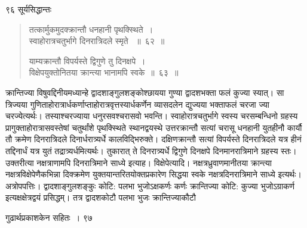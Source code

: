 \documentclass[11pt, openany]{book}
\begin{document}
\noindent ९६ \hspace{4cm} सूर्यसिद्धान्तः 
\vspace{1cm}
\begin{quote}

 {\ssi तत्कार्मुकमुदक्क्रान्तौ धनहानी पृथक्स्थिते~।\\ 
स्वाहोरात्रचतुर्भागे दिनरात्रिदले स्मृते ~॥~६२~॥

याम्यक्रान्तौ विपर्यस्ते द्विगुणे तु दिनक्षपे~।\\
विक्षेपयुक्तोनितया क्रान्त्या भानामपि स्वके~॥~६३~॥}
\end{quote}
\begin{sloppypar}
 क्रान्तिज्या विषुवद्दिनीयमध्यान्हे द्वादशाङ्गुलशङ्कोश्छायया गुण्या द्वादशभक्ता फलं कुज्या स्यात्। सा त्रिज्यया गुणिताहोरात्रार्धकर्णाप्ताहोरात्रवृत्तस्यार्धकर्णेन व्यासदलेन द्युज्यया भक्ताफलं चरजा ज्या चरज्येत्यर्थः। तस्याश्चरज्याया धनुरसवश्चरासवो भवन्ति। स्वाहोरात्रचतुर्भागे स्वस्य चरसम्बन्धिनो ग्रहस्य प्रागुक्ताहोरात्रासवस्तेषां चतुर्थांशे पृथक्स्थिते स्थानद्वयस्थे उत्तरक्रान्तौ सत्यां चरासू धनहानी युतहीनौ कार्यौ तौ क्रमेण दिनरात्रिदले दिनार्धरात्र्यर्धे कालविद्भिरुक्ते। दक्षिणक्रान्तौ सत्यां विपर्यस्ते दिनरात्रिदले यत्र हीनं तद्दिनार्धं यत्र युतं तद्रात्र्यर्धमित्यर्थः। तुकारात् ते दिनरात्र्यर्धे द्विगुणे दिनक्षपे दिनमानरात्रिमाने ग्रहस्य स्तः। उक्तरीत्या नक्षत्राणामपि दिनरात्रिमाने साध्ये इत्याह। विक्षेपेत्यादि। नक्षत्रध्रुवाणमानीतया क्रान्त्या नक्षत्रविक्षेपेणैकभिन्ना दिक्क्रमेण युक्तयान्तरितयोक्तप्रकारेण सिद्धया स्वके नक्षत्रदिनरात्रिमाने साध्ये इत्यर्थः। अत्रोपपत्तिः। द्वादशाङ्गुलशङ्कुः कोटि: पलभा भुजोऽक्षकर्णः कर्णः क्रान्तिज्या कोटि: कुज्या भुजोऽग्राकर्ण इत्यक्षक्षेत्रद्वयं प्रसिद्धम्। तत्र द्वादशकोटौ पलभा भुजः क्रान्तिज्याकौटौ
\end{sloppypar}


\newpage


\hspace{3cm}   गुढार्थप्रकाशकेन सहितः~। \hfill ९७
\vspace{1cm}
\end{document}
